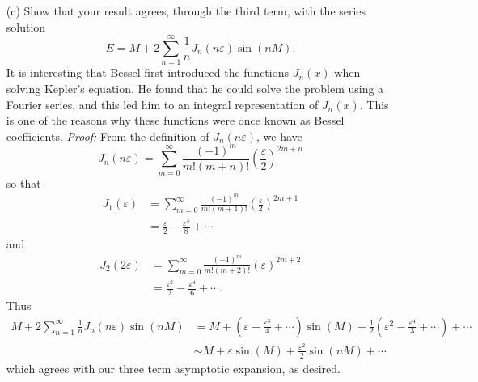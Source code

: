 \documentclass{article}
\begin{document}
\begin{itemize}
\begin{itemize}
        

        \item[(c)] Show that your result agrees, through the third term, with the series solution
        \[E = M + 2\sum_{n = 1}^{\infty} \frac{1}{n}J_n(n\varepsilon)\sin(nM).\]
         It is interesting that Bessel first introduced the functions $J_n(x)$ when solving Kepler's equation. He found that he could solve the problem using a Fourier series, and this led him to an integral representation of $J_n(x)$. This is one of the reasons why these functions were once known as Bessel coefficients.
         \newline\newline
         \textit{Proof:} From the definition of $J_n(n\varepsilon)$, we have
         \[J_n(n\varepsilon) = \sum_{m = 0}^{\infty}\frac{(-1)^m}{m!(m + n)!}\left(\frac{\varepsilon}{2}\right)^{2m + n}\]
         so that
         \begin{align*}
             J_1(\varepsilon) &= \sum_{m = 0}^{\infty}\frac{(-1)^m}{m!(m + 1)!}\left(\frac{\varepsilon}{2}\right)^{2m + 1}\\
             &= \frac{\varepsilon}{2} - \frac{\varepsilon^3}{8} + \cdots
          \end{align*}
          and
          \begin{align*}
              J_2(2\varepsilon) &= \sum_{m = 0}^{\infty}\frac{(-1)^m}{m!(m+2)!}\left(\varepsilon\right)^{2m + 2}\\
              &= \frac{\varepsilon^2}{2} - \frac{\varepsilon^4}{6} + \cdots.
          \end{align*}
          Thus 
          \begin{align*}
              M + 2\sum_{n = 1}^{\infty} \frac{1}{n}J_n(n\varepsilon)\sin(nM) &= M + \left(\varepsilon - \frac{\varepsilon^3}{4} + \cdots\right)\sin(M) + \frac{1}{2}\left(\varepsilon^2 - \frac{\varepsilon^4}{3} + \cdots\right) + \cdots\\
              &\sim M + \varepsilon\sin(M) + \frac{\varepsilon^2}{2}\sin(nM) + \cdots
          \end{align*}
          which agrees with our three term asymptotic expansion, as desired.
    \end{itemize}
\end{itemize}
\end{document}

